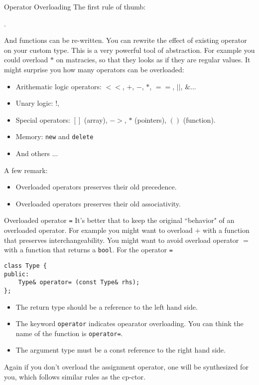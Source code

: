 \begin{frame}[fragile]{Operator Overloading}
The first rule of thumb: 
\begin{center}
	.
\end{center}
And functions can be re-written. You can rewrite the effect of existing operator on your custom type. This is a very powerful tool of abstraction. For example you could overload $*$ on matracies, so that they looks as if they are regular values. It might surprise you how many operators can be overloaded:
\begin{itemize}
	\item Arithematic logic operators: $<<$, $+$, $-$, $*$, $==$, $||$, $\&$...
	\item Unary logic: $!$, $~$
	\item Special operators: $[]$ (array), $->$, $*$ (pointers), $()$ (function).
	\item Memory: \texttt{new} and \texttt{delete}
	\item And others ...
\end{itemize}

A few remark:
\begin{itemize}
	\item Overloaded operators preserves their old precedence. 
	\item Overloaded operators preserves their old associativity.
\end{itemize}
\end{frame}

\begin{frame}[fragile]{Overloaded operator \texttt{=}}
\small
It's better that to keep the original ``behavior" of an overloaded operator. For example you might want to overload $+$ with a function that preserves interchangeability. You might want to avoid overload operator $=$ with a function that returns a \texttt{bool}. For the operator \texttt{=}

\begin{verbatim}
class Type {
public:
	Type& operator= (const Type& rhs);
};
\end{verbatim}
\begin{itemize}
	\item The return type should be a reference to the left hand side.
	\item The keyword \texttt{operator} indicates opearator overloading. You can think the name of the function is \texttt{operator=}.
	\item The argument type must be a const reference to the right hand side. 
\end{itemize}
Again if you don't overload the assignment operator, one will be synthesized for you, which follows similar rules as the cp-ctor.
\end{frame}


